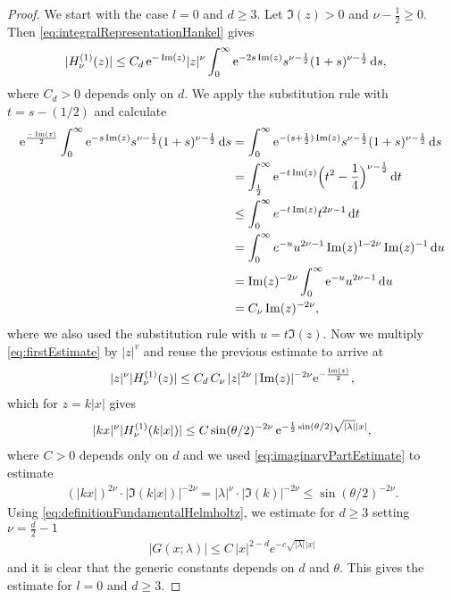 \begin{proof}
  We start with the case $l = 0$ and $d \geq 3$.
  Let $\Im(z) > 0$ and $\nu - \frac{1}{2} \geq 0$.
  Then \eqref{eq:integralRepresentationHankel} gives
  \begin{align}
    \label{eq:firstEstimate}
    |H_\nu^{(1)}(z)|
    &\leq C_d \, \mathrm{e}^{-\operatorname{Im}(z)} |z|^\nu \int_0^\infty \mathrm{e}^{-2s \operatorname{Im}(z)} s^{\nu - \frac{1}{2}} (1 + s)^{\nu - \frac{1}{2}} \, {\operatorname{d}\!{s}},
  \end{align}
  where $C_d > 0$ depends only on $d$.
  We apply the substitution rule with $t = s - (1/2)$ and calculate
  \begin{align*}
    \mathrm{e}^{\frac{-\operatorname{Im}(z)}{2}} \int_0^\infty \mathrm{e}^{-s \operatorname{Im}(z)} s^{\nu - \frac{1}{2}} ( 1 + s )^{\nu - \frac{1}{2}} \, {\operatorname{d}\!{s}}
    &= \int_0^\infty \mathrm{e}^{- (s + \frac{1}{2}) \operatorname{Im}(z)} s^{\nu - \frac{1}{2}} ( 1 + s )^{\nu - \frac{1}{2}} \, {\operatorname{d}\!{s}} \\
    &= \int_{\frac{1}{2}}^\infty \mathrm{e}^{-t \operatorname{Im}(z) } \Big(t^2 - \frac{1}{4} \Big) ^{\nu - \frac{1}{2}} \, {\operatorname{d}\!{t}} \\
    &\leq \int_0^\infty e^{-t \operatorname{Im}(z)} t^{2\nu - 1} \, {\operatorname{d}\!{t}} \\
    &= \int_0^\infty e^{-u}  u^{2 \nu - 1} \operatorname{Im}(z)^{1 - 2\nu} \operatorname{Im}(z)^{-1} \, {\operatorname{d}\!{u}} \\
    &= \operatorname{Im}(z)^{-2 \nu} \int_0^\infty \mathrm{e}^{-u} u^{2 \nu - 1} \, {\operatorname{d}\!{u}} \\
    &= C_\nu \operatorname{Im}(z)^{-2 \nu},
  \end{align*}
  where we also used the substitution rule with $u = t \Im(z)$.
  Now we multiply \eqref{eq:firstEstimate} by $|z|^{v}$ and reuse the previous estimate to arrive at
  \begin{align*}
    |z|^\nu |H_\nu^{(1)}(z)| \leq C_d \, C_\nu\, |z|^{2 \nu} \, |\operatorname{Im}(z)|^{-2\nu} \mathrm{e}^{-\frac{\operatorname{Im}(z)}{2}},
  \end{align*}
  which for $z = k|x|$ gives
  \begin{align}
    \label{eq:zHEstimate}
    |kx|^\nu |H_\nu^{(1)}(k |x|)| \leq C \sin(\theta/2)^{-2\nu} \, \mathrm{e}^{-\frac{1}{2} \sin(\theta/2) \sqrt{|\lambda|} |x|},
  \end{align}
  where $C > 0$ depends only on $d$ and we used \eqref{eq:imaginaryPartEstimate} to estimate
  \begin{align*}
    (|kx|)^{2\nu} \cdot |\Im(k|x|)|^{-2\nu} 
    = |\lambda|^\nu \cdot |\Im(k)|^{-2\nu} 
    \leq \sin(\theta/2)^{-2\nu}.
  \end{align*}
  Using \eqref{eq:definitionFundamentalHelmholtz}, we estimate for $d \geq 3$ setting $\nu = \frac{d}{2} - 1$
  \begin{align*}
    |G(x; \lambda)| 
    \leq C\,  |x|^{2 - d} e^{-c \sqrt{|\lambda|} |x|}
  \end{align*}
  and it is clear that the generic constants depends on $d$ and $\theta$.
  This gives the estimate for $l = 0$ and $d \geq 3$.


\end{proof}
